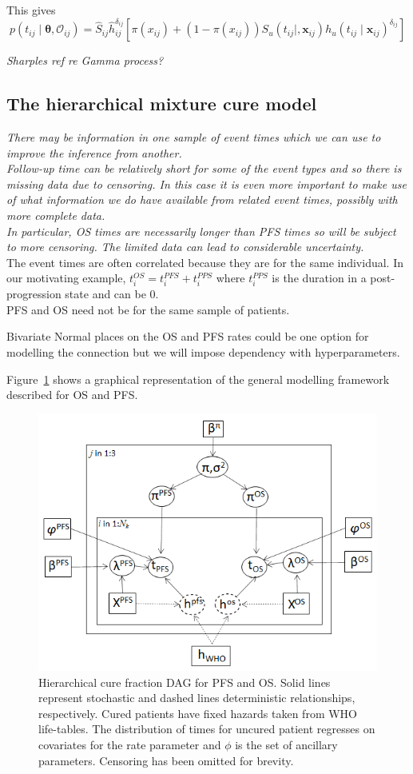 \documentclass[AMA,STIX1COL]{WileyNJD-v2}
\begin{document}
This gives
\begin{equation*}
p(t_{ij} \mid \bm\theta, \mathcal{O}_{ij}) = \hat{S}_{ij} \hat{h}_{ij}^{\delta_{ij}} \left[\pi(x_{ij}) + (1 - \pi(x_{ij})) S_u(t_{ij} \mid, \boldsymbol{x}_{ij}) h_u(t_{ij} \mid \boldsymbol{x}_{ij})^{\delta_{ij}} \right]
\end{equation*}

{\it Sharples ref re Gamma process?}


\subsection{The hierarchical mixture cure model}
{\it There may be information in one sample of event times which we can use to improve the inference from another.\\
Follow-up time can be relatively short for some of the event types and so there is missing data due to censoring.
In this case it is even more important to make use of what information we do have available from related event times, possibly with more complete data.\\
In particular, OS times are necessarily longer than PFS times so will be subject to more censoring.
The limited data can lead to considerable uncertainty.}\\

The event times are often correlated because they are for the same individual.
In our motivating example, $t_i^{OS} = t_i^{PFS} + t_i^{PPS}$ where $t_i^{PPS}$ is the duration in a post-progression state and can be $0$.\\
PFS and OS need not be for the same sample of patients.

Bivariate Normal places on the OS and PFS rates could be one option for modelling the connection\cite{Tan2018} but we will impose dependency with hyperparameters.

Figure~\ref{fig:hier_dag} shows a graphical representation of the general modelling framework described for OS and PFS.

\begin{figure}
\centering
\includegraphics[width=0.6\linewidth]{DAG_with_Tx.png}
\caption{\label{fig:hier_dag} Hierarchical cure fraction DAG for PFS and OS.
Solid lines represent stochastic and dashed lines deterministic relationships, respectively.
Cured patients have fixed hazards taken from WHO life-tables.
The distribution of times for uncured patient regresses on covariates for the rate parameter and $\phi$ is the set of ancillary parameters.
Censoring has been omitted for brevity.}
\end{figure}
\end{document}
